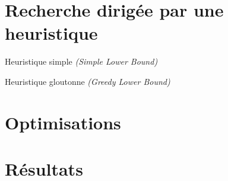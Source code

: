     \section{Recherche dirigée par une heuristique}
        \begin{frame}{Heuristique simple \textit{(Simple Lower Bound)}}

        \end{frame}

        \begin{frame}{Heuristique gloutonne \textit{(Greedy Lower Bound)}}
        \end{frame}

    \section{Optimisations}
        \begin{frame}{}
        \end{frame}

    \section{Résultats}

